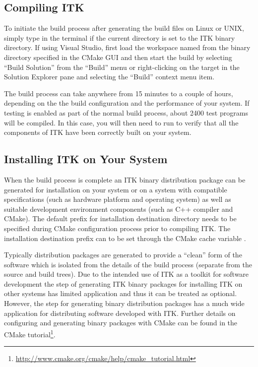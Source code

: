 \subsection{Compiling ITK}
\label{sec:BuildITK}


To initiate the build process after generating the build files on Linux or UNIX,
simply type  in the terminal if the current directory is set to the
ITK binary directory. If using Visual Studio, first load the workspace named
 from the binary directory specified in the CMake GUI and then
start the build by selecting ``Build Solution'' from the ``Build'' menu
or right-clicking on the  target in the Solution Explorer pane
and selecting the ``Build'' context menu item.

The build process can take anywhere from 15 minutes to a couple of hours,
depending on the the build configuration and the performance of your
system. If testing is enabled as part of the normal build process,
about 2400 test programs will be compiled. In this case, you will then need
to run  to verify that all the components of ITK have been correctly built
on your system.

\subsection{Installing ITK on Your System}
\label{sec:Installation}


When the build process is complete an ITK binary distribution package can be
generated for installation on your system or on a system with compatible
specifications (such as hardware platform and operating system) as well as
suitable development environment components (such as C++ compiler and CMake).
The default prefix for installation destination directory needs to be specified
during CMake configuration process prior to compiling ITK. The installation
destination prefix can to be set through the CMake cache variable
.

Typically distribution packages are generated to provide a ``clean'' form of the
software which is isolated from the details of the build process (separate from
the source and build trees). Due to the intended use of ITK as a toolkit for
software development the step of generating ITK binary packages for installing
ITK on other systems has limited application and thus it can be treated as
optional. However, the step for generating binary distribution packages has a
much wide application for distributing software developed with ITK. Further
details on configuring and generating binary packages with CMake can be found in
the CMake tutorial\footnote{
\url{http://www.cmake.org/cmake/help/cmake_tutorial.html}}.

